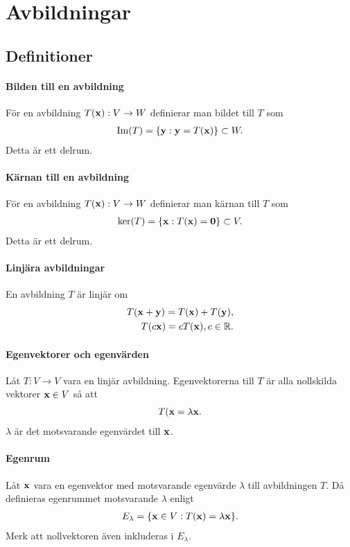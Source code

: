 \section{Avbildningar}

\subsection{Definitioner}

\paragraph{Bilden till en avbildning}
För en avbildning $T(\vect{x}): V\to W$ definierar man bildet till $T$ som
\begin{align*}
	\Im{T} = \{\vect{y} : \vect{y} = T(\vect{x})\}\subset W.
\end{align*}
Detta är ett delrum.

\paragraph{Kärnan till en avbildning}
För en avbildning $T(\vect{x}): V\to W$ definierar man kärnan till $T$ som
\begin{align*}
	\ker{T} = \{\vect{x} : T(\vect{x})= \vect{0}\}\subset V.
\end{align*}
Detta är ett delrum.

\paragraph{Linjära avbildningar}
En avbildning $T$ är linjär om
\begin{align*}
	T(\vect{x} + \vect{y}) = T(\vect{x}) + T(\vect{y}), \\
	T(c\vect{x}) = cT(\vect{x}), c\in\R.
\end{align*}

\paragraph{Egenvektorer och egenvärden}\label{par:eigen_values}
Låt $T: V\to V$ vara en linjär avbildning. Egenvektorerna till $T$ är alla nollskilda vektorer $\vect{x}\in V$ så att
\begin{align*}
	T(\vect{x} = \lambda\vect{x}.
\end{align*}
$\lambda$ är det motsvarande egenvärdet till $\vect{x}$.

\paragraph{Egenrum}
Låt $\vect{x}$ vara en egenvektor med motsvarande egenvärde $\lambda$ till avbildningen $T$. Då definieras egenrummet motsvarande $\lambda$ enligt
\begin{align*}
	E_\lambda = \{\vect{x}\in V: T(\vect{x}) = \lambda\vect{x}\}.
\end{align*}
Merk att nollvektoren även inkluderas i $E_\lambda$.


